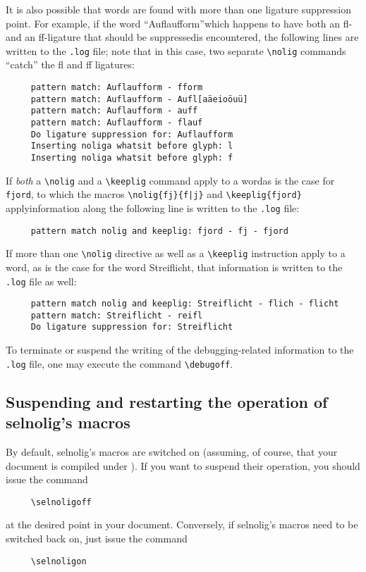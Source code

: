 \documentclass[11pt]{article}
\newcommand{\pkg}[1]{\textsf{#1}}
\newcommand{\opt}[1]{\texttt{#1}}
\newcommand{\cmmd}[1]{\texttt{\textbackslash #1}}
\begin{document}
It is also possible that words are found with more than one ligature suppression point. For example, if the word \enquote{Auflaufform}\textemdash which happens to have both an fl- and an ff-ligature that should be suppressed\textemdash is encountered, the following lines are written to the \opt{.log} file; note that in this case, two separate \cmmd{nolig} commands \enquote{catch} the fl and ff ligatures:
\begin{Verbatim}
     pattern match: Auflaufform - fform
     pattern match: Auflaufform - Aufl[aäeioöuü]
     pattern match: Auflaufform - auff
     pattern match: Auflaufform - flauf
     Do ligature suppression for: Auflaufform
     Inserting noliga whatsit before glyph: l
     Inserting noliga whatsit before glyph: f
\end{Verbatim}

If \emph{both} a \cmmd{nolig} and a \cmmd{keeplig} command apply to a word\textemdash as is the case for \opt{fjord}, to which the macros \Verb+\nolig{fj}{f|j}+ and \Verb+\keeplig{fjord}+ apply\textemdash information along the following line is written to the \opt{.log} file:
\begin{Verbatim}
     pattern match nolig and keeplig: fjord - fj - fjord
\end{Verbatim}

If more than one \cmmd{nolig} directive as well as a \cmmd{keeplig} instruction apply to a word, as is the case for the word Streiflicht, that information is written to the \opt{.log} file as well:
\begin{Verbatim}
     pattern match nolig and keeplig: Streiflicht - flich - flicht
     pattern match: Streiflicht - reifl
     Do ligature suppression for: Streiflicht
\end{Verbatim}

To terminate or suspend the writing of the debugging-related information to the \opt{.log} file, one may execute the command \Verb+\debugoff+.

\subsection[Suspending and restarting the operation of selnolig's macros]{Suspending and restarting the operation of \pkg{selnolig}'s macros}

By default, \pkg{selnolig}'s macros are switched on (assuming, of course, that your document is compiled under \LuaLaTeX). If you want to suspend their operation, you should issue the command
\begin{Verbatim}
     \selnoligoff
\end{Verbatim}
at the desired point in your document. Conversely, if \pkg{selnolig}'s macros need to be switched back on, just issue the command
\begin{Verbatim}
     \selnoligon
\end{Verbatim}
\end{document}

